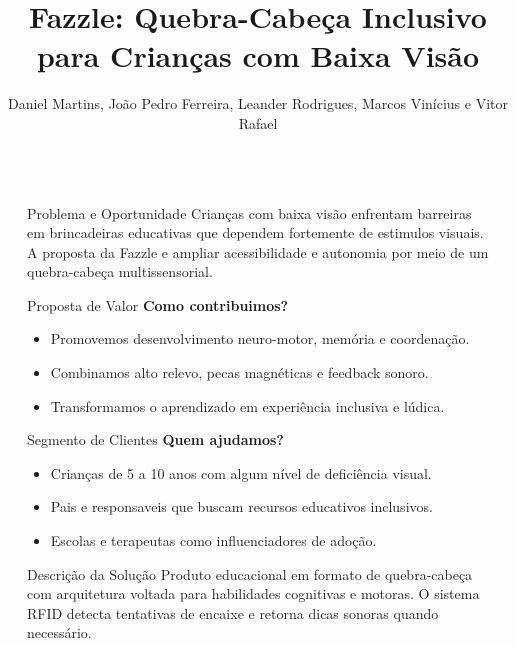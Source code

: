 \documentclass[final]{beamer}
\title{Fazzle: Quebra-Cabeça Inclusivo para Crianças com Baixa Visão}
\author{Daniel Martins, João Pedro Ferreira, Leander Rodrigues, Marcos Vinícius e Vitor Rafael}
\institute[shortinst]{Organização Empresarial}
\newlength{\sepwidth}
\newlength{\colwidth}
\newcommand{\separatorcolumn}{\begin{column}{\sepwidth}\end{column}}
\begin{document}
\begin{frame}[t]
\begin{columns}[t]
\separatorcolumn

\begin{column}{\colwidth}

  \begin{alertblock}{Problema e Oportunidade}
    Crianças com baixa visão enfrentam barreiras em brincadeiras educativas que
    dependem fortemente de estimulos visuais. A proposta da Fazzle e ampliar
    acessibilidade e autonomia por meio de um quebra-cabeça multissensorial.
  \end{alertblock}

  \begin{block}{Proposta de Valor}
    \textbf{Como contribuimos?}

    \begin{itemize}
      \item Promovemos desenvolvimento neuro-motor, memória e coordenação.
      \item Combinamos alto relevo, pecas magnéticas e feedback sonoro.
      \item Transformamos o aprendizado em experiência inclusiva e lúdica.
    \end{itemize}
  \end{block}

  \begin{block}{Segmento de Clientes}
    \textbf{Quem ajudamos?}

    \begin{itemize}
      \item Crianças de 5 a 10 anos com algum nível de deficiência visual.
      \item Pais e responsaveis que buscam recursos educativos inclusivos.
      \item Escolas e terapeutas como influenciadores de adoção.
    \end{itemize}
  \end{block}

  \begin{block}{Descrição da Solução}
    Produto educacional em formato de quebra-cabeça com arquitetura voltada para
    habilidades cognitivas e motoras. O sistema RFID detecta tentativas de
    encaixe e retorna dicas sonoras quando necessário.
  \end{block}

\end{column}

\separatorcolumn


\end{columns}
\end{frame}
\end{document}
